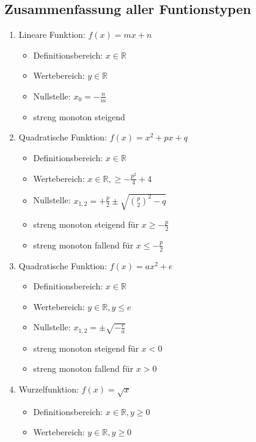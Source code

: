 \newpage
\subsection{Zusammenfassung aller Funtionstypen}

\begin{enumerate}
    \item Lineare Funktion: $f(x)=mx+n$ \begin{itemize}
              \item Definitionsbereich: $x\in\mathbb{R}$
              \item Wertebereich: $y\in\mathbb{R}$
              \item Nullstelle: $x_0=-\frac{n}{m}$
              \item streng monoton steigend
          \end{itemize}
    \item Quadratische Funktion: $f(x)=x^2+px+q$ \begin{itemize}
              \item Definitionsbereich: $x\in\mathbb{R}$
              \item Wertebereich: $x\in\mathbb{R},\geq-\frac{p^2}{4}+4$
              \item Nullstelle: $x_{1,2}=+\frac{p}{2} \pm \sqrt{\binom{p}{2}^2-q}$
              \item streng monoton steigend für $x \geq -\frac{p}{2}$
              \item streng monoton fallend für $x \leq -\frac{p}{2}$
          \end{itemize}
    \item Quadratische Funktion: $f(x)=ax^2+e$ \begin{itemize}
              \item Definitionsbereich: $x\in\mathbb{R}$
              \item Wertebereich: $y\in\mathbb{R},y\leq e$
              \item Nullstelle: $x_{1,2} = \pm \sqrt{-\frac{e}{a}}$
              \item streng monoton steigend für $x<0$
              \item streng monoton fallend für $x>0$
          \end{itemize}
    \item Wurzelfunktion: $f(x)=\sqrt{x}$\begin{itemize}
              \item Definitionsbereich: $x\in\mathbb{R},y\geq 0$
              \item Wertebereich: $y\in\mathbb{R},y\geq 0$

\end{itemize}
\end{enumerate}
